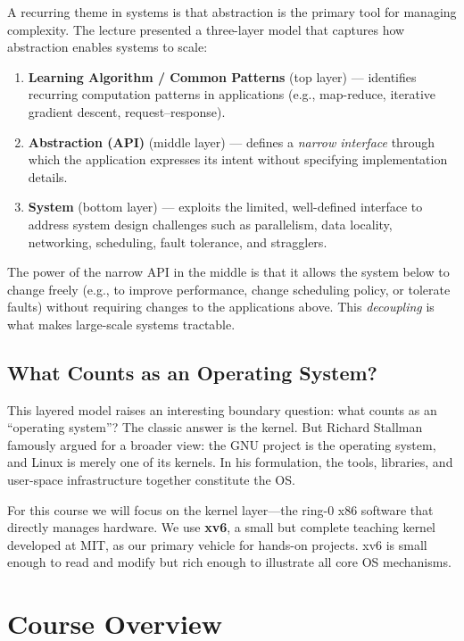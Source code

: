 \documentclass[11pt]{article}
\begin{document}
A recurring theme in systems is that abstraction is the primary tool for managing complexity.
The lecture presented a three-layer model that captures how abstraction enables systems to scale:

\begin{enumerate}
    \item \textbf{Learning Algorithm / Common Patterns} (top layer) --- identifies recurring
          computation patterns in applications (e.g., map-reduce, iterative gradient descent,
          request--response).
    \item \textbf{Abstraction (API)} (middle layer) --- defines a \emph{narrow interface} through
          which the application expresses its intent without specifying implementation details.
    \item \textbf{System} (bottom layer) --- exploits the limited, well-defined interface to
          address system design challenges such as parallelism, data locality, networking,
          scheduling, fault tolerance, and stragglers.
\end{enumerate}

The power of the narrow API in the middle is that it allows the system below to change freely
(e.g., to improve performance, change scheduling policy, or tolerate faults) without requiring
changes to the applications above. This \emph{decoupling} is what makes large-scale systems
tractable.

\subsection{What Counts as an Operating System?}

This layered model raises an interesting boundary question: what counts as an ``operating
system''? The classic answer is the kernel. But Richard Stallman famously argued for a broader
view: the GNU project is the operating system, and Linux is merely one of its kernels. In his
formulation, the tools, libraries, and user-space infrastructure together constitute the OS.

For this course we will focus on the kernel layer---the ring-0 x86 software that directly manages
hardware. We use \textbf{xv6}, a small but complete teaching kernel developed at MIT, as our
primary vehicle for hands-on projects. xv6 is small enough to read and modify but rich enough to
illustrate all core OS mechanisms.

\section{Course Overview}
\end{document}
